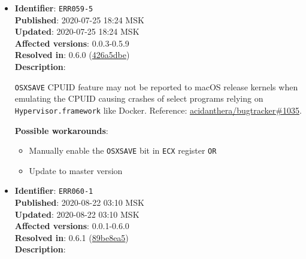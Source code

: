 \documentclass[]{article}
\providecommand{\tightlist}{%
  \setlength{\itemsep}{0pt}\setlength{\parskip}{0pt}}
\begin{document}
\begin{itemize}
  \textbf{Possible workarounds}:
  \begin{itemize}
    \tightlist
    \item For \textbf{preview} version of KernelCollection injection code please update
    to commit \texttt{d8ace476} and make sure that variables forcing legacy
    kernel loading (\texttt{boober-fileset-kernel} and \texttt{boober-fileset-basesystem})
    are deleted from NVRAM.
    \item For \textbf{preinstalled} versions of macOS 11 add NVRAM variable \\
    \texttt{7C436110-AB2A-4BBB-A880-FE41995C9F82:boober-fileset-kernel}
    with \texttt{00} value; for some EfiBoot variants it may also be
    required to set \texttt{boober-fileset-basesystem} variable with \texttt{00} value.
  \end{itemize}


\item
  \textbf{Identifier}: \texttt{ERR059-5} \\
  \textbf{Published}: 2020-07-25 18:24 MSK \\
  \textbf{Updated}: 2020-07-25 18:24 MSK \\
  \textbf{Affected versions}: 0.0.3-0.5.9 \\
  \textbf{Resolved in}: 0.6.0 (\href{https://github.com/acidanthera/OpenCorePkg/commit/426a5dbe09365d3fe1d18dbde9868fe12900c30c}{426a5dbe}) \\
  \textbf{Description}:

  \texttt{OSXSAVE} CPUID feature may not be reported to macOS release kernels when emulating the CPUID
  causing crashes of select programs relying on \texttt{Hypervisor.framework} like Docker. Reference:
  \href{https://github.com/acidanthera/bugtracker/issues/1035}{acidanthera/bugtracker\#1035}.

  \textbf{Possible workarounds}:
  \begin{itemize}
    \tightlist
    \item Manually enable the \texttt{OSXSAVE} bit in \texttt{ECX} register \texttt{OR}
    \item Update to master version
  \end{itemize}

\item
  \textbf{Identifier}: \texttt{ERR060-1} \\
  \textbf{Published}: 2020-08-22 03:10 MSK \\
  \textbf{Updated}: 2020-08-22 03:10 MSK \\
  \textbf{Affected versions}: 0.0.1-0.6.0 \\
  \textbf{Resolved in}: 0.6.1 (\href{https://github.com/acidanthera/OpenCorePkg/commit/89be8ea5bb98dc8c9eb49a5e29c5343643535ae4}{89be8ea5}) \\
  \textbf{Description}:


\end{itemize}
\end{document}
